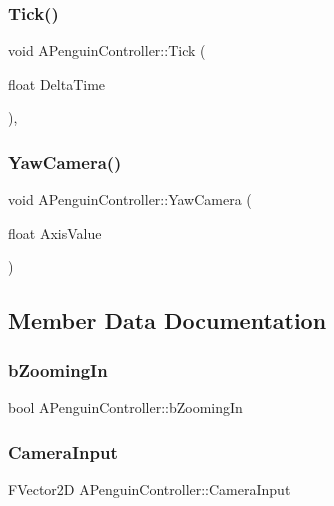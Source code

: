 \mbox{\label{class_a_penguin_controller_a89357a5a41897aae83fe07bd9672fd56}} 
\subsubsection{Tick()}
{\footnotesize\ttfamily void A\+Penguin\+Controller\+::\+Tick (\begin{DoxyParamCaption}\item[{float}]{Delta\+Time }\end{DoxyParamCaption})\hspace{0.3cm}{\ttfamily [override]}, {\ttfamily [virtual]}}

\mbox{\label{class_a_penguin_controller_a728d5fe6aea42d8c0b44e136265b2960}} 
\subsubsection{YawCamera()}
{\footnotesize\ttfamily void A\+Penguin\+Controller\+::\+Yaw\+Camera (\begin{DoxyParamCaption}\item[{float}]{Axis\+Value }\end{DoxyParamCaption})}



\subsection{Member Data Documentation}
\mbox{\label{class_a_penguin_controller_acbc53133774ad63c5c78f5b3a35627b1}} 
\subsubsection{bZoomingIn}
{\footnotesize\ttfamily bool A\+Penguin\+Controller\+::b\+Zooming\+In}

\mbox{\label{class_a_penguin_controller_ac51051e3396e7fa3f5dce0acc7a1d4ee}} 
\subsubsection{CameraInput}
{\footnotesize\ttfamily F\+Vector2D A\+Penguin\+Controller\+::\+Camera\+Input}

